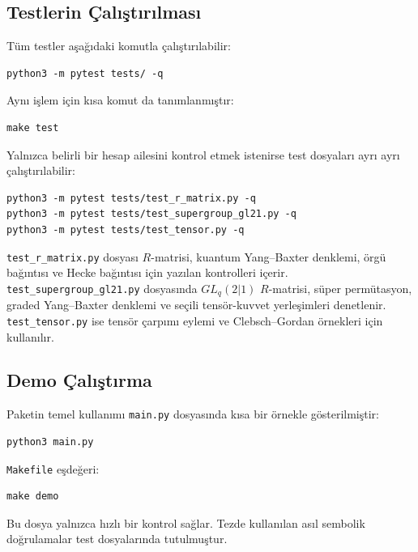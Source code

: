 \documentclass[10pt]{math}
\numberwithin{equation}{section}
\theoremstyle{plain}
\theoremstyle{definition}
\begin{document}
\subsection{Testlerin Çalıştırılması}

Tüm testler aşağıdaki komutla çalıştırılabilir:
\begin{lstlisting}[style=bashblock]
python3 -m pytest tests/ -q
\end{lstlisting}

Aynı işlem için kısa komut da tanımlanmıştır:
\begin{lstlisting}[style=bashblock]
make test
\end{lstlisting}

Yalnızca belirli bir hesap ailesini kontrol etmek istenirse test dosyaları ayrı
ayrı çalıştırılabilir:
\begin{lstlisting}[style=bashblock]
python3 -m pytest tests/test_r_matrix.py -q
python3 -m pytest tests/test_supergroup_gl21.py -q
python3 -m pytest tests/test_tensor.py -q
\end{lstlisting}

\texttt{test\_r\_matrix.py} dosyası $R$-matrisi, kuantum Yang--Baxter denklemi,
örgü bağıntısı ve Hecke bağıntısı için yazılan kontrolleri içerir.
\texttt{test\_supergroup\_gl21.py} dosyasında $GL_q(2|1)$ $R$-matrisi, süper
permütasyon, graded Yang--Baxter denklemi ve seçili tensör-kuvvet yerleşimleri
denetlenir. \texttt{test\_tensor.py} ise tensör çarpımı eylemi ve
Clebsch--Gordan örnekleri için kullanılır.

\subsection{Demo Çalıştırma}

Paketin temel kullanımı \texttt{main.py} dosyasında kısa bir örnekle
gösterilmiştir:
\begin{lstlisting}[style=bashblock]
python3 main.py
\end{lstlisting}

\texttt{Makefile} eşdeğeri:
\begin{lstlisting}[style=bashblock]
make demo
\end{lstlisting}

Bu dosya yalnızca hızlı bir kontrol sağlar. Tezde kullanılan asıl sembolik
doğrulamalar test dosyalarında tutulmuştur.
\end{document}
